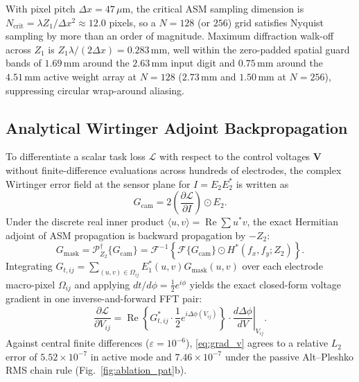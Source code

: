 \documentclass[journal]{IEEEtran}
\begin{document}
With pixel pitch $\Delta x = 47\,\mu\text{m}$, the critical ASM sampling dimension is $N_{\mathrm{crit}} = \lambda Z_1 / \Delta x^2 \approx 12.0$ pixels, so a $N=128$ (or $256$) grid satisfies Nyquist sampling by more than an order of magnitude. Maximum diffraction walk-off across $Z_1$ is $Z_1\lambda/(2\Delta x) = 0.283\,\text{mm}$, well within the zero-padded spatial guard bands of $1.69\,\text{mm}$ around the $2.63\,\text{mm}$ input digit and $0.75\,\text{mm}$ around the $4.51\,\text{mm}$ active weight array at $N=128$ ($2.73\,\text{mm}$ and $1.50\,\text{mm}$ at $N=256$), suppressing circular wrap-around aliasing.

\subsection{Analytical Wirtinger Adjoint Backpropagation}
To differentiate a scalar task loss $\mathcal{L}$ with respect to the control voltages $\mathbf{V}$ without finite-difference evaluations across hundreds of electrodes, the complex Wirtinger error field at the sensor plane for $I = E_2 E_2^*$ is written as
\begin{equation}
  G_{\mathrm{cam}} = 2 \left(\frac{\partial \mathcal{L}}{\partial I}\right) \odot E_2.
  \label{eq:wirtinger}
\end{equation}
Under the discrete real inner product $\langle u, v \rangle = \operatorname{Re}\sum u^* v$, the exact Hermitian adjoint of ASM propagation is backward propagation by $-Z_2$:
\begin{equation}
  G_{\mathrm{mask}} = \mathcal{P}_{Z_2}^{\dagger}\{G_{\mathrm{cam}}\} = \mathcal{F}^{-1}\!\left\{\mathcal{F}\{G_{\mathrm{cam}}\} \odot H^*(f_x, f_y; Z_2)\right\}.
  \label{eq:adjoint}
\end{equation}
Integrating $G_{t,ij} = \sum_{(u,v)\in\Omega_{ij}} E_1^*(u,v) G_{\mathrm{mask}}(u,v)$ over each electrode macro-pixel $\Omega_{ij}$ and applying $dt/d\phi = \frac{1}{2}e^{i\phi}$ yields the exact closed-form voltage gradient in one inverse-and-forward FFT pair:
\begin{equation}
  \frac{\partial \mathcal{L}}{\partial V_{ij}} = \operatorname{Re}\!\left\{G_{t,ij}^* \cdot \frac{1}{2}e^{i\Delta\phi(V_{ij})}\right\} \cdot \left.\frac{d\Delta\phi}{dV}\right|_{V_{ij}}.
  \label{eq:grad_v}
\end{equation}
Against central finite differences ($\varepsilon = 10^{-6}$), \eqref{eq:grad_v} agrees to a relative $L_2$ error of $5.52 \times 10^{-7}$ in active mode and $7.46 \times 10^{-7}$ under the passive Alt--Pleshko RMS chain rule (Fig.~\ref{fig:ablation_pat}b).
\end{document}
